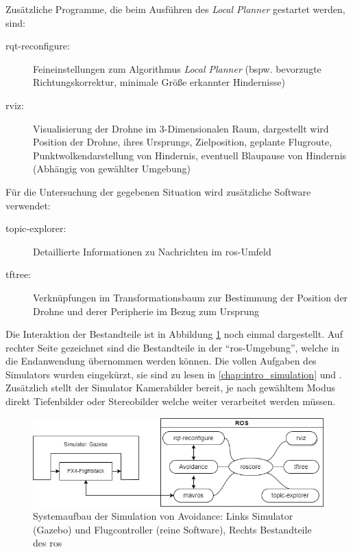 Zusätzliche Programme, die beim Ausführen des \textit{Local Planner} gestartet werden, sind:
\begin{description}
    \item[rqt-reconfigure:] Feineinstellungen zum Algorithmus \textit{Local Planner} (bspw. bevorzugte Richtungskorrektur, minimale Größe erkannter Hindernisse)
    \item[rviz:] Visualisierung der Drohne im 3-Dimensionalen Raum, dargestellt wird Position der Drohne, ihres Ursprungs, Zielposition, geplante Flugroute, Punktwolkendarstellung von Hindernis, eventuell Blaupause von Hindernis (Abhängig von gewählter Umgebung)
\end{description}
Für die Untersuchung der gegebenen Situation wird zusätzliche Software verwendet:
\begin{description}
    \item[topic-explorer:] Detaillierte Informationen zu Nachrichten im \acrshort{ros}-Umfeld
    \item[tftree:] Verknüpfungen im Transformationsbaum zur Bestimmung der Position der Drohne und derer Peripherie im Bezug zum Ursprung 
\end{description}

Die Interaktion der Bestandteile ist in Abbildung \ref{fig:system_sim_origin} noch einmal dargestellt. Auf rechter Seite gezeichnet sind die Bestandteile in der \enquote{\acrshort{ros}-Umgebung}, welche in die Endanwendung übernommen werden können. Die vollen Aufgaben des Simulators wurden eingekürzt, sie sind zu lesen in \cref{chap:intro_simulation} und \cite[Kapitel 3.4.1]{markusreinErweiterungBestehenderDrohnen2023}. Zusätzlich stellt der Simulator Kamerabilder bereit, je nach gewähltem Modus direkt Tiefenbilder oder Stereobilder welche weiter verarbeitet werden müssen. 
\begin{figure}[!ht]
    \centering
    \includegraphics[width=\linewidth]{images/simulation_ros.drawio.png}
    \caption[Systemaufbau der Simulation von Avoidance]{Systemaufbau der Simulation von Avoidance: Links Simulator (Gazebo) und Flugcontroller (reine Software), Rechts Bestandteile des \acrshort{ros}}
    \label{fig:system_sim_origin}
\end{figure}


